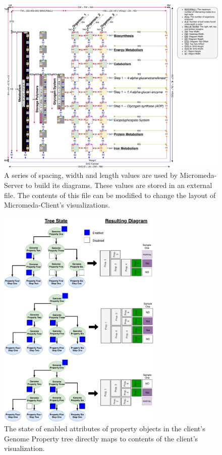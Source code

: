 \begin{figure}[!ht]
  \centering
	\includegraphics[width=\textwidth]{media/diagram_measurements.pdf}
	 \caption{A series of spacing, width and length values are used by Micromeda-Server to build its diagrams. These values are stored in an external file. The contents of this file can be modified to change the layout of Micromeda-Client's visualizations.}
	 \label{fig:diagram-measurements}
\end{figure}

\begin{figure}[!ht]
  \centering
	\includegraphics[width=0.7\textwidth]{media/how_tree_state_maps.pdf}
	 \caption{The state of enabled attributes of property objects in the client's Genome Property tree directly maps to contents of the client's visualization.}
	 \label{fig:tree-map-to-viz}
\end{figure}

